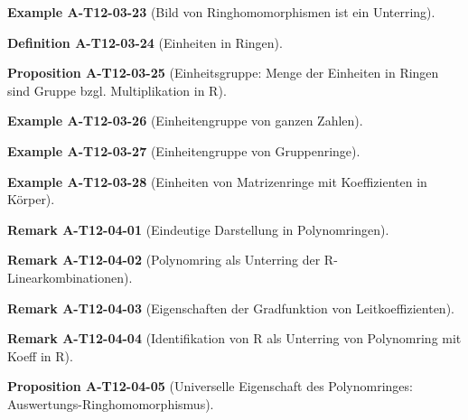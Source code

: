 \documentclass[10pt, letterpaper]{article}
\newcommand{\CustomHeading}[3]{%
  \par\medskip\noindent%
  \textbf{#1 #2} \textnormal{(#3)}.\enskip%
}
\newenvironment{DEF}[2]{\CustomHeading{Definition}{#1}{#2}}{}
\newenvironment{PROP}[2]{\CustomHeading{Proposition}{#1}{#2}}{}
\newenvironment{REM}[2]{\CustomHeading{Remark}{#1}{#2}}{}
\newenvironment{EXA}[2]{\CustomHeading{Example}{#1}{#2}}{}
\begin{document}
\begin{EXA}{A-T12-03-23}{Bild von Ringhomomorphismen ist ein Unterring}
\end{EXA}

\begin{DEF}{A-T12-03-24}{Einheiten in Ringen}
\end{DEF}

\begin{PROP}{A-T12-03-25}{Einheitsgruppe: Menge der Einheiten in Ringen sind Gruppe bzgl. Multiplikation in R}
\end{PROP}

\begin{EXA}{A-T12-03-26}{Einheitengruppe von ganzen Zahlen}
\end{EXA}

\begin{EXA}{A-T12-03-27}{Einheitengruppe von Gruppenringe}
\end{EXA}

\begin{EXA}{A-T12-03-28}{Einheiten von Matrizenringe mit Koeffizienten in Körper}
\end{EXA}

\begin{REM}{A-T12-04-01}{Eindeutige Darstellung in Polynomringen}
\end{REM}

\begin{REM}{A-T12-04-02}{Polynomring als Unterring der R-Linearkombinationen}
\end{REM}

\begin{REM}{A-T12-04-03}{Eigenschaften der Gradfunktion von Leitkoeffizienten}
\end{REM}

\begin{REM}{A-T12-04-04}{Identifikation von R als Unterring von Polynomring mit Koeff in R}
\end{REM}

\begin{PROP}{A-T12-04-05}{Universelle Eigenschaft des Polynomringes: Auswertungs-Ringhomomorphismus}
\end{PROP}
\end{document}
